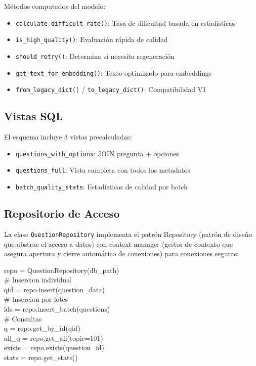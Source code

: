 \documentclass[10pt,twocolumn,letterpaper]{article}
\begin{document}
M\'etodos computados del modelo:
\begin{itemize}[nosep,leftmargin=*]
  \item \texttt{calculate\_difficult\_rate()}: Tasa de dificultad basada en estad\'isticas
  \item \texttt{is\_high\_quality()}: Evaluaci\'on r\'apida de calidad
  \item \texttt{should\_retry()}: Determina si necesita regeneraci\'on
  \item \texttt{get\_text\_for\_embedding()}: Texto optimizado para embeddings
  \item \texttt{from\_legacy\_dict()} / \texttt{to\_legacy\_dict()}: Compatibilidad V1
\end{itemize}

\subsection{Vistas SQL}

El esquema incluye 3 vistas precalculadas:
\begin{itemize}[nosep,leftmargin=*]
  \item \texttt{questions\_with\_options}: JOIN pregunta + opciones
  \item \texttt{questions\_full}: Vista completa con todos los metadatos
  \item \texttt{batch\_quality\_stats}: Estad\'isticas de calidad por batch
\end{itemize}

\subsection{Repositorio de Acceso}

La clase \texttt{QuestionRepository} implementa el patr\'on Repository (patr\'on de
dise\~no que abstrae el acceso a datos) con context manager (gestor de contexto
que asegura apertura y cierre autom\'atico de conexiones) para conexiones seguras:

\begin{tcolorbox}[colback=bglight, colframe=bordercolor, boxrule=0.5pt, arc=2pt]
{\small\ttfamily
repo = QuestionRepository(db\_path)\\
\# Insercion individual\\
qid = repo.insert(question\_data)\\
\# Insercion por lotes\\
ids = repo.insert\_batch(questions)\\
\# Consultas\\
q = repo.get\_by\_id(qid)\\
all\_q = repo.get\_all(topic=101)\\
exists = repo.exists(question\_id)\\
stats = repo.get\_stats()
}
\end{tcolorbox}
\end{document}
